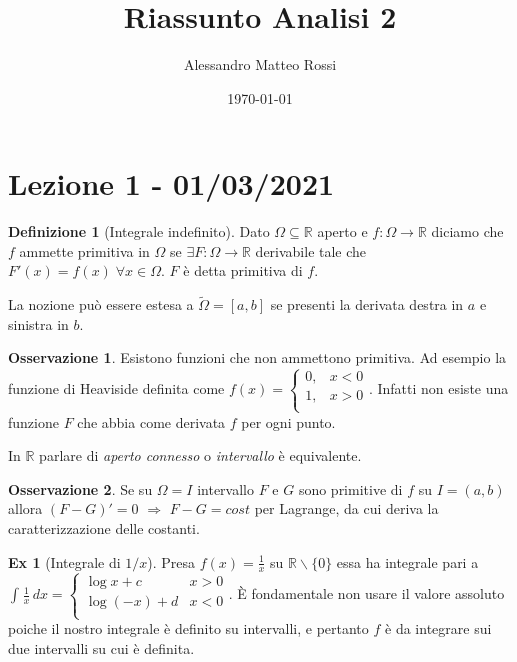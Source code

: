\documentclass{article}
\title{Riassunto Analisi 2}
\author{Alessandro Matteo Rossi}
\date{\today}
\theoremstyle{definition}
\theoremstyle{definition}
\theoremstyle{definition}
\newtheorem{definition}{Definizione}[section]
\theoremstyle{definition}
\newtheorem{remark}{Osservazione}[section]
\theoremstyle{definition}
\newtheorem{example}{Ex}[section]
\theoremstyle{definition}
\begin{document}
\maketitle
\tableofcontents
\newpage
\section{Lezione 1 - 01/03/2021}


\begin{definition}[Integrale indefinito]
    Dato $\Omega \subseteq \mathbb{R}$ aperto e $f:\Omega \rightarrow \mathbb{R}$ diciamo che $f$ ammette primitiva in $\Omega$ se $\exists F:\Omega \rightarrow \mathbb{R}$ derivabile tale che $F'(x)=f(x) \; \forall x \in \Omega$. $F$ è detta primitiva di $f$.
\end{definition}

La nozione può essere estesa a $\tilde\Omega = [a,b]$ se presenti la derivata destra in $a$ e sinistra in $b$.

\vspace{3mm}

\begin{remark}
    Esistono funzioni che non ammettono primitiva. Ad esempio la funzione di Heaviside definita come $f(x)=
    \begin{cases}
    0, & \text{$x < 0$} \\
    1, & \text{$x > 0$} \\
    \end{cases}$. Infatti non esiste una funzione $F$ che abbia come derivata $f$ per ogni punto.
\end{remark}

\vspace{3mm}

In $\mathbb{R}$ parlare di \textit{aperto connesso} o \textit{intervallo} è equivalente.

\begin{remark}
    Se su $\Omega = I$ intervallo $F$ e $G$ sono primitive di $f$ su $I=(a,b)$ allora $(F-G)'=0$ $\Rightarrow$ $F-G=cost$ per Lagrange, da cui deriva la caratterizzazione delle costanti.
\end{remark}

\begin{example}[Integrale di $1/x$]
    Presa $f(x)=\frac{1}{x}$ su $\mathbb{R} \backslash \lbrace 0 \rbrace$ essa ha integrale pari a 
        $\int_{}^{} \frac{1}{x} \, dx = 
        \begin{cases}
        \log x + c & \text{$x > 0$} \\
        \log (-x) +d  & \text{$x < 0$} \\
        \end{cases}$. 
    È fondamentale non usare il valore assoluto poiche il nostro integrale è definito su intervalli, e pertanto $f$ è da integrare sui due intervalli su cui è definita.
\end{example}
\end{document}
